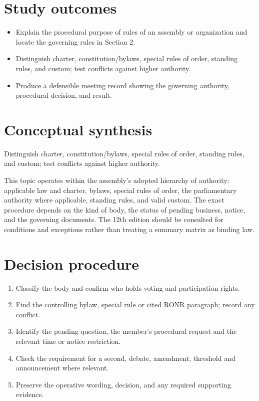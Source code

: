 \documentclass[11pt]{article}
\begin{document}
\SuiteOpen
{}
\section{Study outcomes}
\begin{itemize}[leftmargin=*,itemsep=4pt]
\item Explain the procedural purpose of rules of an assembly or organization and locate the governing rules in Section 2.
\item Distinguish charter, constitution/bylaws, special rules of order, standing rules, and custom; test conflicts against higher authority.
\item Produce a defensible meeting record showing the governing authority, procedural decision, and result.
\end{itemize}

\section{Conceptual synthesis}
Distinguish charter, constitution/bylaws, special rules of order, standing rules, and custom; test conflicts against higher authority.

This topic operates within the assembly’s adopted hierarchy of authority: applicable law and charter, bylaws, special rules of order, the parliamentary authority where applicable, standing rules, and valid custom. The exact procedure depends on the kind of body, the status of pending business, notice, and the governing documents. The 12th edition should be consulted for conditions and exceptions rather than treating a summary matrix as binding law.
\section{Decision procedure}
\begin{enumerate}[leftmargin=*,itemsep=4pt]
\item Classify the body and confirm who holds voting and participation rights.
\item Find the controlling bylaw, special rule or cited RONR paragraph; record any conflict.
\item Identify the pending question, the member’s procedural request and the relevant time or notice restriction.
\item Check the requirement for a second, debate, amendment, threshold and announcement where relevant.
\item Preserve the operative wording, decision, and any required supporting evidence.
\end{enumerate}
\end{document}
